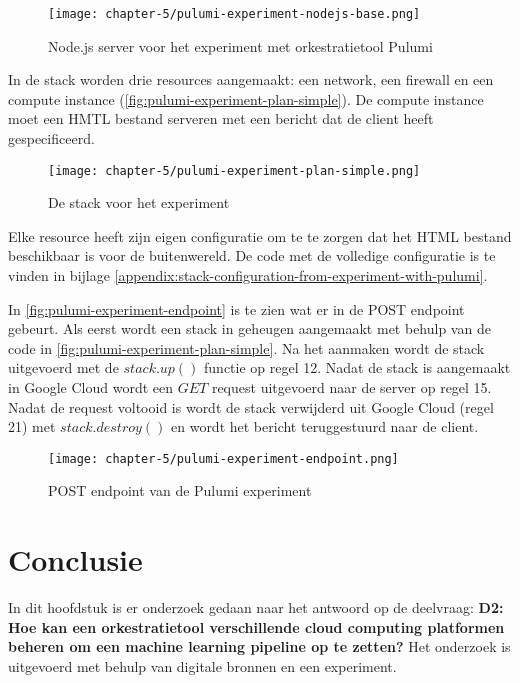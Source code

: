 \begin{figure}[hbt!]
  \centering
  \texttt{[image: chapter-5/pulumi-experiment-nodejs-base.png]}
  \caption{Node.js server voor het experiment met orkestratietool Pulumi}
  \label{fig:pulumi-experiment-nodejs-base}
\end{figure}

In de stack worden drie resources aangemaakt: een network, een firewall en een compute instance (\autoref{fig:pulumi-experiment-plan-simple}). De compute instance moet een HMTL bestand serveren met een bericht dat de client heeft gespecificeerd. 

\begin{figure}[hbt!]
  \centering
  \texttt{[image: chapter-5/pulumi-experiment-plan-simple.png]}
  \caption{De stack voor het experiment}
  \label{fig:pulumi-experiment-plan-simple}
\end{figure}

Elke resource heeft zijn eigen configuratie om te te zorgen dat het HTML bestand beschikbaar is voor de buitenwereld. De code met de volledige configuratie is te vinden in bijlage \ref{appendix:stack-configuration-from-experiment-with-pulumi}.

In \autoref{fig:pulumi-experiment-endpoint} is te zien wat er in de POST endpoint gebeurt. Als eerst wordt een stack in geheugen aangemaakt met behulp van de code in \autoref{fig:pulumi-experiment-plan-simple}. Na het aanmaken wordt de stack uitgevoerd met de \(stack.up()\) functie op regel 12. Nadat de stack is aangemaakt in Google Cloud wordt een \(GET\) request uitgevoerd naar de server op regel 15. Nadat de request voltooid is wordt de stack verwijderd uit Google Cloud (regel 21) met \(stack.destroy()\) en wordt het bericht teruggestuurd naar de client.

\begin{figure}[hbt!]
  \centering
  \texttt{[image: chapter-5/pulumi-experiment-endpoint.png]}
  \caption{POST endpoint van de Pulumi experiment}
  \label{fig:pulumi-experiment-endpoint}
\end{figure}

\section{Conclusie}\label{subsec:ch5-conclusie}
In dit hoofdstuk is er onderzoek gedaan naar het antwoord op de deelvraag: \textbf{D2: Hoe kan een orkestratietool verschillende cloud computing platformen beheren om een machine learning pipeline op te zetten?} Het onderzoek is uitgevoerd met behulp van digitale bronnen en een experiment.

